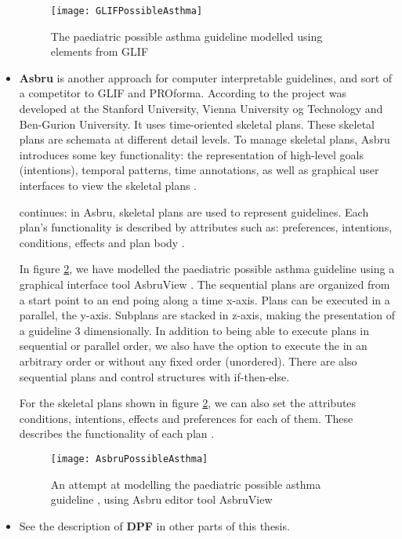\begin{itemize}
	
	\begin{figure}[h!]
		\texttt{[image: GLIFPossibleAsthma]}
		\caption {The paediatric possible asthma guideline \parencite{RepublicofKeny2016} modelled using elements from GLIF}
		\label{fig:GLIFPossibleAsthma}
	\end{figure}
	\item \textbf{Asbru} is another approach for computer interpretable guidelines, and sort of a competitor to GLIF and PROforma. According to \textcite{DeClercq2008} the project was developed at the Stanford University, Vienna University og Technology and Ben-Gurion University. It uses time-oriented skeletal plans. These skeletal plans are schemata at different detail levels. To manage skeletal plans, Asbru introduces some key functionality: the representation of high-level goals (intentions), temporal patterns, time annotations, as well as graphical user interfaces to view the skeletal plans \parencite{DeClercq2008}.
	
	\textcite{DeClercq2008} continues: in Asbru, skeletal plans are used to represent guidelines. Each plan's functionality is described by attributes such as: preferences, intentions, conditions, effects and plan body \parencite{DeClercq2008}. 
	
	In figure \ref{fig:AsbruPossibleAsthma}, we have modelled the paediatric possible asthma guideline \parencite{RepublicofKeny2016} using a graphical interface tool AsbruView \parencite{TheAasgardProject2006}. The sequential plans are organized from a start point to an end poing along a time x-axis. Plans can be executed in a parallel, the y-axis. Subplans are stacked in z-axis, making the presentation of a guideline 3 dimensionally. In addition to being able to execute plans in sequential or parallel order, we also have the option to execute the in an arbitrary order or without any fixed order (unordered). There are also sequential plans and control structures with if-then-else.
	
	For the skeletal plans shown in figure \ref{fig:AsbruPossibleAsthma}, we can also set the attributes conditions, intentions, effects and preferences for each of them. These describes the functionality of each plan \parencite{DeClercq2008}.
	
		\begin{figure}[h!]
		\texttt{[image: AsbruPossibleAsthma]}
		\caption {An attempt at modelling the paediatric possible asthma guideline \parencite{RepublicofKeny2016}, using Asbru editor tool AsbruView \parencite{TheAasgardProject2006}}
		\label{fig:AsbruPossibleAsthma}
	\end{figure}
	\item See the description of \textbf{DPF} in other parts of this thesis.
\end{itemize}
